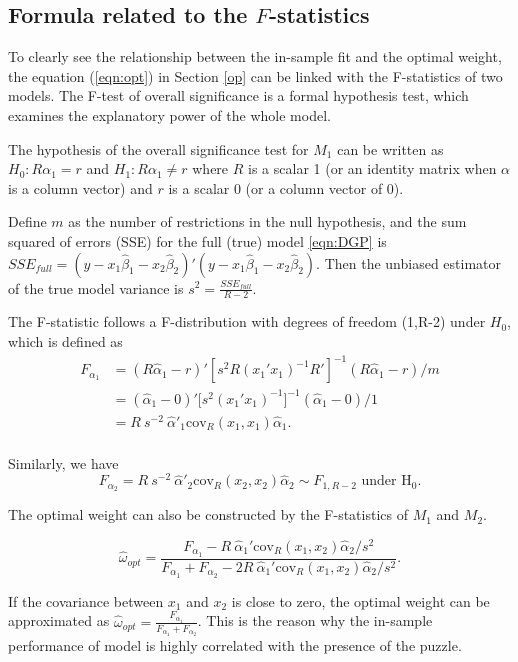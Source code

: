 \documentclass{monashthesis}
\begin{document}
\hypertarget{formula-related-to-the-f-statistics}{%
\subsection{\texorpdfstring{Formula related to the \(F\)-statistics}{Formula related to the F-statistics}}\label{formula-related-to-the-f-statistics}}

To clearly see the relationship between the in-sample fit and the optimal weight, the equation (\ref{eqn:opt}) in Section \ref{op} can be linked with the F-statistics of two models. The F-test of overall significance is a formal hypothesis test, which examines the explanatory power of the whole model.

The hypothesis of the overall significance test for \(M_1\) can be written as \(H_0: R\alpha_1 = r\) and \(H_1: R\alpha_1 \ne r\) where \(R\) is a scalar 1 (or an identity matrix when \(\alpha\) is a column vector) and \(r\) is a scalar 0 (or a column vector of 0).

Define \(m\) as the number of restrictions in the null hypothesis, and the sum squared of errors (SSE) for the full (true) model \ref{eqn:DGP} is \(SSE_{full} = (y - x_1 \hat\beta_1 - x_2 \hat\beta_2)'(y - x_1 \hat\beta_1 - x_2 \hat\beta_2)\). Then the unbiased estimator of the true model variance is \(s^2=\frac{SSE_{full}}{R-2}\).

The F-statistic follows a F-distribution with degrees of freedom (1,R-2) under \(H_0\), which is defined as
\begin{align*}
F_{\alpha_1} &= (R\hat\alpha_1 - r)'[s^2R(x_1'x_1)^{-1}R']^{-1}(R\hat\alpha_1 - r)/m \\
&= (\hat\alpha_1 - 0)' \Big[s^2(x_1'x_1)^{-1}\Big]^{-1} (\hat\alpha_1 - 0)/1 \\
&= R \ s^{-2} \ \hat\alpha'_1 \text{cov}_R(x_1,x_1) \hat\alpha_1. \\
\end{align*}

Similarly, we have
\begin{equation*}
F_{\alpha_2} = R \ s^{-2} \ \hat\alpha'_2 \text{cov}_R(x_2,x_2) \hat\alpha_2 \sim F_{1,R-2} \text{ under  H}_0.
\end{equation*}

The optimal weight can also be constructed by the F-statistics of \(M_1\) and \(M_2\).

\begin{equation*}
\hat\omega_{opt} = \frac{F_{\alpha_1}- R \ \hat\alpha_1'\text{cov}_R(x_1,x_2)\hat\alpha_2/s^2}{F_{\alpha_1} + F_{\alpha_2} - 2 R \ \hat\alpha_1'\text{cov}_R(x_1,x_2)\hat\alpha_2/s^2}.
\end{equation*}

If the covariance between \(x_1\) and \(x_2\) is close to zero, the optimal weight can be approximated as \(\hat\omega_{opt} = \frac{F_{\alpha_1}}{F_{\alpha_1} + F_{\alpha_2}}\). This is the reason why the in-sample performance of model is highly correlated with the presence of the puzzle.

\printbibliography[title={Reference}]
\end{document}
